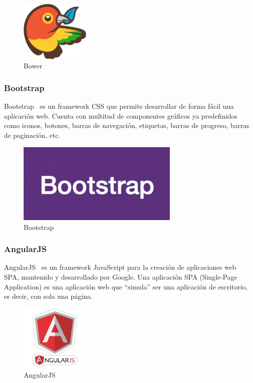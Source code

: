 \begin{figure}[tbh]
\centering
\label{fig:bower}
\includegraphics[width=0.3\textwidth]{imagenes/bower}
\caption{Bower}
\end{figure}

\subsubsection*{Bootstrap}
Bootstrap~\cite{bootstrap} es un framework CSS que permite desarrollar de forma fácil una aplicación web. Cuenta con multitud de componentes gráficos ya predefinidos como iconos, botones, barras de navegación, etiquetas, barras de progreso, barras de paginación, etc.

\begin{figure}[tbh]
\centering
\label{fig:bootstrap}
\includegraphics[width=0.7\textwidth]{imagenes/bootstrap}
\caption{Bootstrap}
\end{figure}

\subsubsection*{AngularJS}
AngularJS~\cite{angular} es un framework JavaScript para la creación de aplicaciones web SPA, mantenido y desarrollado por Google. Una aplicación SPA (Single-Page Application) es una aplicación web que ``simula'' ser una aplicación de escritorio, es decir, con sola una página.

\begin{figure}[tbh]
\centering
\label{fig:angular}
\includegraphics[width=0.3\textwidth]{imagenes/angular}
\caption{AngularJS}
\end{figure}


